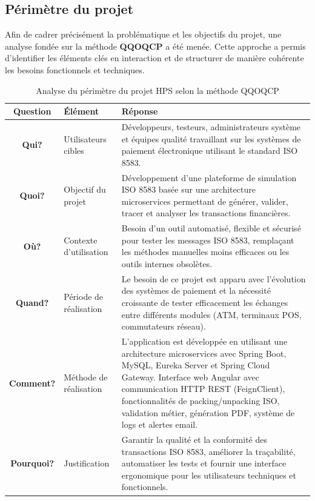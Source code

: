 \subsection{Périmètre du projet}

Afin de cadrer précisément la problématique et les objectifs du projet, une analyse fondée sur la méthode \textbf{QQOQCP} a été menée. Cette approche a permis d’identifier les éléments clés en interaction et de structurer de manière cohérente les besoins fonctionnels et techniques.

\begin{table}[H]
\centering
{}
\renewcommand{\arraystretch}{1.5}
\begin{tabular}{|>{\bfseries}c|m{4cm}|m{7cm}|}
\hline
\rowcolor{blue!20}
\textbf{Question} & \textbf{Élément} & \textbf{Réponse} \\
\hline
\textbf{Qui?} & Utilisateurs cibles & Développeurs, testeurs, administrateurs système et équipes qualité travaillant sur les systèmes de paiement électronique utilisant le standard ISO 8583. \\
\hline
\textbf{Quoi?} & Objectif du projet & Développement d'une plateforme de simulation ISO 8583 basée sur une architecture microservices permettant de générer, valider, tracer et analyser les transactions financières. \\
\hline
\textbf{Où?} & Contexte d'utilisation & Besoin d'un outil automatisé, flexible et sécurisé pour tester les messages ISO 8583, remplaçant les méthodes manuelles moins efficaces ou les outils internes obsolètes. \\
\hline
\textbf{Quand?} & Période de réalisation & Le besoin de ce projet est apparu avec l'évolution des systèmes de paiement et la nécessité croissante de tester efficacement les échanges entre différents modules (ATM, terminaux POS, commutateurs réseau). \\
\hline
\textbf{Comment?} & Méthode de réalisation & L'application est développée en utilisant une architecture microservices avec Spring Boot, MySQL, Eureka Server et Spring Cloud Gateway. Interface web Angular avec communication HTTP REST (FeignClient), fonctionnalités de packing/unpacking ISO, validation métier, génération PDF, système de logs et alertes email. \\
\hline
\textbf{Pourquoi?} & Justification & Garantir la qualité et la conformité des transactions ISO 8583, améliorer la traçabilité, automatiser les tests et fournir une interface ergonomique pour les utilisateurs techniques et fonctionnels. \\
\hline
\end{tabular}
\caption{Analyse du périmètre du projet HPS selon la méthode QQOQCP}
\label{tab:qqoqcp-hps}
\end{table}








